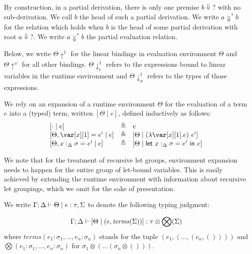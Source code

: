 \documentclass[acmsmall,review,screen]{acmart}
\newcommand{\llet}[2]{\mathsf{let}~#1~\mathsf{in}~#2}
\begin{document}
 By construction, in a partial derivation, there is only one premise
 $b\Downarrow?$ with no sub-derivation. We call $b$ the head of such a
 partial derivation.
We write $a \Downarrow^* b$ for the relation which holds when $b$ is
the head of some partial derivation with root $a \Downarrow?$.  We
write $a \Downarrow^* b$  the partial evaluation relation.
 
Below, we write $\Theta {\uparrow^1}$ for the linear bindings in evaluation
environment $\Theta$ and $\Theta {\uparrow^\omega}$ for all other bindings.
$\Theta\downarrow^1_e$ refers to the expressions bound to linear variables in
the runtime environment and $\Theta\downarrow^1_\sigma$ refers to the types of
those expressions.



 
 \begin{definition}
   We rely on an expansion of a runtime environment $\Theta$ for the evaluation of a term $e$ into a (typed) term, written $[\Theta \mid e]$, defined inductively as follows:
   \[
     \begin{array}{lcl}
       \left[ \cdot \mid e \right] & \triangleq & e\\
       \left[ \Theta , \xl = e' \mid e \right] & \triangleq  & [\Theta \mid (\lambda \xl . e)~e']\\
       \left[\Theta , x:_\Delta \sigma = e' \mid e \right] & \triangleq & [\Theta \mid \llet{x:_\Delta \sigma = e'}{e}]
    \end{array}
   \]
 \end{definition}


We note that for the treatment of recursive let groups, environment
expansion needs to happen for the entire group of let-bound
variables. This is easily achieved by extending the runtime
environment with information about recursive let groupings, which we
omit for the sake of presentation.
 
 \begin{definition}
   We write $\Gamma;\Delta \vdash \Theta \mid e : \tau,\Sigma$ to denote the following typing judgment:

   \[
\Gamma ; \Delta \vdash [ \Theta \mid (e,\mathit{terms}(\Sigma))] : \tau \otimes \bigotimes(\Sigma)
   \]
   where $\mathit{terms}(e_1 : \sigma_1 , \dots , e_n : \sigma_n)$ stands for the tuple $(e_1 ,( \dots , (e_n , ())))$ and
   $\bigotimes(e_1 : \sigma_1 , \dots , e_n : \sigma_n)$ for $\sigma_1 \otimes ( \dots (\sigma_n \otimes ()))$.
 \end{definition}
\end{document}
